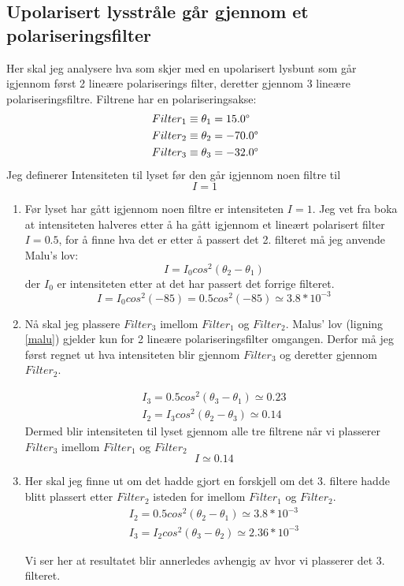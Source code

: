 \documentclass[a4paper,12pt,norsk]{article}
\begin{document}
\subsection{Upolarisert lysstråle går gjennom et polariseringsfilter}
Her skal jeg analysere hva som skjer med en upolarisert lysbunt som går igjennom først 2 lineære polariserings filter, deretter gjennom 3 lineære polariseringsfiltre.  Filtrene har en polariseringsakse:
\begin{align*}
Filter_1 &\equiv \theta_1 = 15.0\degree\\
Filter_2 &\equiv \theta_2 = -70.0\degree\\
Filter_3 &\equiv \theta_3 = -32.0\degree\\
\end{align*}
Jeg definerer Intensiteten til lyset før den går igjennom noen filtre til 
$$
I = 1
$$
\begin{enumerate}[label=(\alph*)]
\item
Før lyset har gått igjennom noen filtre er intensiteten $I=1$. Jeg vet fra boka \cite{boka} at intensiteten halveres etter å ha gått igjennom et lineært polarisert filter $I = 0.5$, for å finne hva det er etter å passert det 2. filteret må jeg anvende Malu's lov:
\begin{equation}
I = I_0cos^2(\theta_2 - \theta_1)
\label{malu}
\end{equation}
der $I_0$ er intensiteten etter at det har passert det forrige filteret.
$$
I = I_0cos^2(-85) = 0.5cos^2(-85) \simeq 3.8*10^{-3}
$$
\item
Nå skal jeg plassere $Filter_3$ imellom $Filter_1$ og $Filter_2$. Malus' lov (ligning \ref{malu}) gjelder kun for 2 lineære polariseringsfilter omgangen. Derfor må jeg først regnet ut hva intensiteten blir gjennom $Filter_3$ og deretter gjennom $Filter_2$.

\begin{align*}
I_3 = 0.5cos^2(\theta_3-\theta_1) \simeq 0.23\\
I_2 = I_3cos^2(\theta_2-\theta_3) \simeq 0.14
\end{align*}
Dermed blir intensiteten til lyset gjennom alle tre filtrene når vi plasserer $Filter_3$ imellom $Filter_1$ og $Filter_2$ 
$$
I \simeq 0.14
$$
\item
Her skal jeg finne ut om det hadde gjort en forskjell om det 3. filtere hadde blitt plassert etter $Filter_2$ isteden for imellom $Filter_1$ og $Filter_2$.
\begin{align*}
I_2 = 0.5cos^2(\theta_2-\theta_1) \simeq 3.8*10^{-3}\\
I_3 = I_2cos^2(\theta_3-\theta_2) \simeq 2.36*10^{-3}
\end{align*}

Vi ser her at resultatet blir annerledes avhengig av hvor vi plasserer det 3. filteret. 
\end{enumerate}
\end{document}
